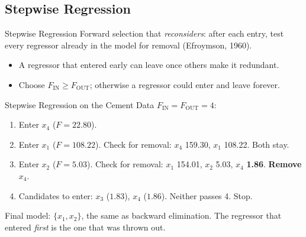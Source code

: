 \subsection{Stepwise Regression}


\begin{frame}{Stepwise Regression}
    Forward selection that \emph{reconsiders}: after each entry, test every regressor already in the model for removal (Efroymson, 1960).
    \begin{center}
    \end{center}
    \small
    \begin{itemize}
        \item A regressor that entered early can leave once others make it redundant.
        \item Choose $F_{\text{IN}}\ge F_{\text{OUT}}$; otherwise a regressor could enter and leave forever.
    \end{itemize}
\end{frame}


\begin{frame}{Stepwise Regression on the Cement Data}
    $F_{\text{IN}}=F_{\text{OUT}}=4$:
    \begin{enumerate}
        \item Enter $x_4$ ($F=22.80$).
        \item Enter $x_1$ ($F=108.22$). Check for removal: $x_4$ 159.30, $x_1$ 108.22. Both stay.
        \item Enter $x_2$ ($F=5.03$). Check for removal: $x_1$ 154.01, $x_2$ 5.03, $x_4$ \textbf{1.86}. \textbf{Remove $x_4$}.
        \item Candidates to enter: $x_3$ ($1.83$), $x_4$ ($1.86$). Neither passes 4. Stop.
    \end{enumerate}
    \svspace{0.3em}
    Final model: $\{x_1,x_2\}$, the same as backward elimination. The regressor that entered \emph{first} is the one that was thrown out.
\end{frame}


